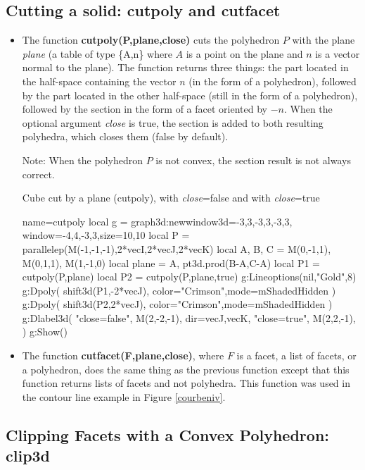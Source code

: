 \subsection{Cutting a solid: cutpoly and cutfacet}

\begin{itemize}
    \item The function \textbf{cutpoly(P,plane,close)} cuts the polyhedron $P$ with the plane \emph{plane} (a ​​table of type \{A,n\} where $A$ is a point on the plane and $n$ is a vector normal to the plane). The function returns three things: the part located in the half-space containing the vector $n$ (in the form of a polyhedron), followed by the part located in the other half-space (still in the form of a polyhedron), followed by the section in the form of a facet oriented by $-n$. When the optional argument \emph{close} is true, the section is added to both resulting polyhedra, which closes them (false by default).\par
Note: When the polyhedron $P$ is not convex, the section result is not always correct.

\begin{demo}{Cube cut by a plane (cutpoly), with \emph{close}=false and with \emph{close}=true}
\begin{luadraw}{name=cutpoly}
local g = graph3d:new{window3d={-3,3,-3,3,-3,3}, window={-4,4,-3,3},size={10,10}}
local P = parallelep(M(-1,-1,-1),2*vecI,2*vecJ,2*vecK)
local A, B, C = M(0,-1,1), M(0,1,1), M(1,-1,0)
local plane = {A, pt3d.prod(B-A,C-A)}
local P1 = cutpoly(P,plane)
local P2 = cutpoly(P,plane,true)
g:Lineoptions(nil,"Gold",8)
g:Dpoly( shift3d(P1,-2*vecJ), {color="Crimson",mode=mShadedHidden} )
g:Dpoly( shift3d(P2,2*vecJ), {color="Crimson",mode=mShadedHidden} )
g:Dlabel3d(
    "close=false", M(2,-2,-1), {dir={vecJ,vecK}},
    "close=true", M(2,2,-1), {}
    )
g:Show()            
\end{luadraw}
\end{demo}

    \item The function \textbf{cutfacet(F,plane,close)}, where $F$ is a facet, a list of facets, or a polyhedron, does the same thing as the previous function except that this function returns lists of facets and not polyhedra. This function was used in the contour line example in Figure \ref{courbeniv}.
\end{itemize}

\subsection{Clipping Facets with a Convex Polyhedron: clip3d}


